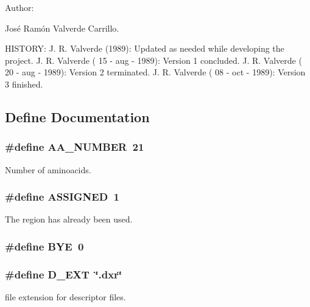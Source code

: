 \begin{Desc}
\item[Author: ]\par
Jos\'{e} Ram\'{o}n Valverde Carrillo.\end{Desc}
HISTORY:  J. R. Valverde (1989):  Updated as needed while developing the project.  J. R. Valverde ( 15 - aug - 1989):  Version 1 concluded.  J. R. Valverde ( 20 - aug - 1989):  Version 2 terminated.  J. R. Valverde ( 08 - oct - 1989):  Version 3 finished.



\subsection{Define Documentation}
\subsubsection{\setlength{\rightskip}{0pt plus 5cm}\#define AA\_\-NUMBER\ 21}\label{P__defs_8h_a7}


Number of aminoacids.

\subsubsection{\setlength{\rightskip}{0pt plus 5cm}\#define ASSIGNED\ 1}\label{P__defs_8h_a8}


The region has already been used.

\subsubsection{\setlength{\rightskip}{0pt plus 5cm}\#define BYE\ 0}\label{P__defs_8h_a35}


\subsubsection{\setlength{\rightskip}{0pt plus 5cm}\#define D\_\-EXT\ \char`\"{}.dxr\char`\"{}}\label{P__defs_8h_a15}


file extension for descriptor files.

